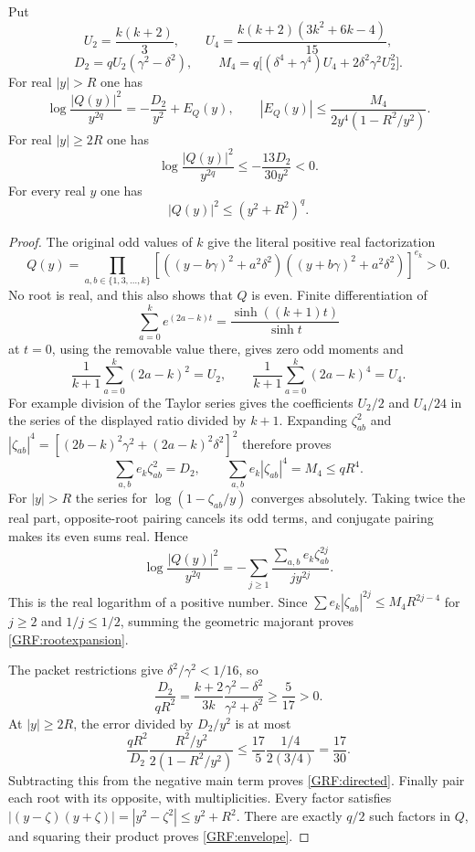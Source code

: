 \documentclass[11pt,a4paper]{article}
\begin{document}
\begin{grflemma}\label{GRF:roots}
Put
\[
 U_2=\frac{k(k+2)}3,\qquad
 U_4=\frac{k(k+2)(3k^2+6k-4)}{15},
\]
\[
 D_2=qU_2(\gamma^2-\delta^2),\qquad
 M_4=q\bigl[(\delta^4+\gamma^4)U_4
                  +2\delta^2\gamma^2U_2^2\bigr].
\]
For real $|y|>R$ one has
\begin{equation*}\tag{GRF6}\label{GRF:rootexpansion}
 \log\frac{|Q(y)|^2}{y^{2q}}=-\frac{D_2}{y^2}+E_Q(y),
 \qquad
 |E_Q(y)|\le\frac{M_4}{2y^4(1-R^2/y^2)}.
\end{equation*}
For real $|y|\ge2R$ one has
\begin{equation*}\tag{GRF7}\label{GRF:directed}
 \log\frac{|Q(y)|^2}{y^{2q}}
 \le-\frac{13D_2}{30y^2}<0.
\end{equation*}
For every real $y$ one has
\begin{equation*}\tag{GRF8}\label{GRF:envelope}
 |Q(y)|^2\le(y^2+R^2)^q.
\end{equation*}
\end{grflemma}
\begin{proof}
The original odd values of $k$ give the literal positive real factorization
\[
 Q(y)=\prod_{a,b\in\{1,3,\ldots,k\}}
 \left[((y-b\gamma)^2+a^2\delta^2)
       ((y+b\gamma)^2+a^2\delta^2)\right]^{e_k}>0.
\]
No root is real, and this also shows that $Q$ is even. Finite differentiation
of
\[
 \sum_{a=0}^k e^{(2a-k)t}=
 \frac{\sinh((k+1)t)}{\sinh t}
\]
at $t=0$, using the removable value there, gives zero odd moments and
\[
 \frac1{k+1}\sum_{a=0}^k(2a-k)^2=U_2,
 \qquad
 \frac1{k+1}\sum_{a=0}^k(2a-k)^4=U_4.
\]
For example division of the Taylor series gives the coefficients
$U_2/2$ and $U_4/24$ in the series of the displayed ratio divided by $k+1$.
Expanding $\zeta_{ab}^2$ and
$|\zeta_{ab}|^4=[(2b-k)^2\gamma^2+(2a-k)^2\delta^2]^2$
therefore proves
\[
 \sum_{a,b}e_k\zeta_{ab}^2=D_2,
 \qquad \sum_{a,b}e_k|\zeta_{ab}|^4=M_4\le qR^4.
\]
For $|y|>R$ the series for $\log(1-\zeta_{ab}/y)$ converges absolutely.
Taking twice the real part, opposite-root pairing cancels its odd terms,
and conjugate pairing makes its even sums real. Hence
\[
 \log\frac{|Q(y)|^2}{y^{2q}}
 =-\sum_{j\ge1}\frac{\sum_{a,b}e_k\zeta_{ab}^{2j}}{j y^{2j}}.
\]
This is the real logarithm of a positive number. Since
$\sum e_k|\zeta_{ab}|^{2j}\le M_4R^{2j-4}$ for $j\ge2$ and
$1/j\le1/2$, summing the geometric majorant proves
\eqref{GRF:rootexpansion}.

The packet restrictions give $\delta^2/\gamma^2<1/16$, so
\[
 \frac{D_2}{qR^2}
 =\frac{k+2}{3k}\frac{\gamma^2-\delta^2}{\gamma^2+\delta^2}
 \ge\frac{5}{17}>0.
\]
At $|y|\ge2R$, the error divided by $D_2/y^2$ is at most
\[
 \frac{qR^2}{D_2}\frac{R^2/y^2}{2(1-R^2/y^2)}
 \le\frac{17}{5}\frac{1/4}{2(3/4)}=\frac{17}{30}.
\]
Subtracting this from the negative main term proves \eqref{GRF:directed}.
Finally pair each root with its opposite, with multiplicities. Every factor
satisfies $|(y-\zeta)(y+\zeta)|=|y^2-\zeta^2|\le y^2+R^2$.
There are exactly $q/2$ such factors in $Q$, and squaring their product
proves \eqref{GRF:envelope}.
\end{proof}
\end{document}
